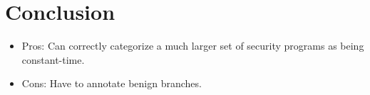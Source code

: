 \section{Conclusion}


\begin{itemize}
  \item Pros: Can correctly categorize a much larger set of security programs as being constant-time.
  \item Cons: Have to annotate benign branches.
\end{itemize}
